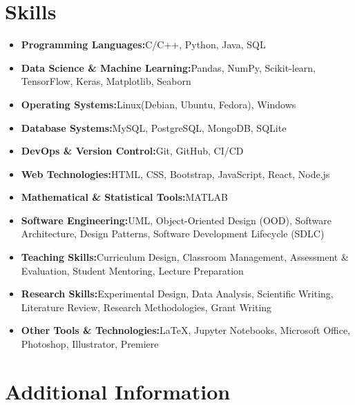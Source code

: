 \documentclass[a4paper,11pt]{article}
\newcommand{\resumeItem}[2]{
	\item{
		\textbf{#1}{\hspace{0.5mm}#2 \vspace{-0.5mm}}
	}
}
\newcommand{\resumeSubItem}[2]{\resumeItem{#1}{#2}\vspace{-4pt}}
\newcommand{\resumeHeadingSkillStart}{\begin{itemize}[leftmargin=*,itemsep=1.7mm, rightmargin=2ex]}
\newcommand{\resumeHeadingSkillEnd}{\end{itemize}\vspace{-2mm}}
\begin{document}
	\section{\textbf{Skills}}
	\vspace{1mm}
	\resumeHeadingSkillStart
	\resumeSubItem{Programming Languages:}
	{C/C++, Python, Java, SQL}
	\resumeSubItem{Data Science \& Machine Learning:}
	{Pandas, NumPy, Scikit-learn, TensorFlow, Keras, Matplotlib, Seaborn}
	\resumeSubItem{Operating Systems:}
	{Linux(Debian, Ubuntu, Fedora), Windows}
	\resumeSubItem{Database Systems:}
	{MySQL, PostgreSQL, MongoDB, SQLite}
	\resumeSubItem{DevOps \& Version Control:}
	{Git, GitHub, CI/CD}
	\resumeSubItem{Web Technologies:}
	{HTML, CSS, Bootstrap, JavaScript, React, Node.js}
	\resumeSubItem{Mathematical \& Statistical Tools:}
	{MATLAB}
	\resumeSubItem{Software Engineering:}
	{UML, Object-Oriented Design (OOD), Software Architecture, Design Patterns, Software Development Lifecycle (SDLC)}
	\resumeSubItem{Teaching Skills:}
	{Curriculum Design, Classroom Management, Assessment \& Evaluation, Student Mentoring, Lecture Preparation}
	\resumeSubItem{Research Skills:}
	{Experimental Design, Data Analysis, Scientific Writing, Literature Review, Research Methodologies, Grant Writing}
	\resumeSubItem{Other Tools \& Technologies:}
	{LaTeX, Jupyter Notebooks, Microsoft Office, Photoshop, Illustrator, Premiere}
	\resumeHeadingSkillEnd

	\section{\textbf{Additional Information}}
	\vspace{1mm}
\end{document}
